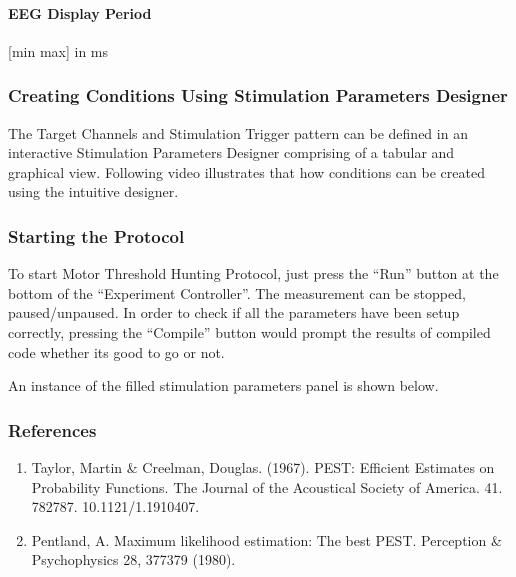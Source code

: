 \documentclass[letterpaper,10pt,english]{sphinxmanual}
\begin{document}
\paragraph{EEG Display Period}
\label{\detokenize{7_MEPThresholdHunting:eeg-display-period}}
\sphinxAtStartPar
{[}min max{]} in ms


\subsubsection{Creating Conditions Using Stimulation Parameters Designer}
\label{\detokenize{7_MEPThresholdHunting:creating-conditions-using-stimulation-parameters-designer}}
\sphinxAtStartPar
The Target Channels and Stimulation Trigger pattern can be defined in an interactive Stimulation Parameters Designer comprising of a tabular and graphical view. Following video illustrates that how conditions can be created using the intuitive designer.


\subsubsection{Starting the Protocol}
\label{\detokenize{7_MEPThresholdHunting:starting-the-protocol}}
\sphinxAtStartPar
To start Motor Threshold Hunting Protocol, just press the “Run” button at the bottom of the “Experiment Controller”. The measurement can be stopped, paused/unpaused. In order to check if all the parameters have been setup correctly, pressing the “Compile” button would prompt the results of compiled code whether its good to go or not.

\sphinxAtStartPar
An instance of the filled stimulation parameters panel is shown below.

\begin{figure}[htbp]
\centering

\noindent{}
\end{figure}


\subsubsection{References}
\label{\detokenize{7_MEPThresholdHunting:references}}\begin{enumerate}
%
\item {} 
\sphinxAtStartPar
Taylor, Martin \& Creelman, Douglas. (1967). PEST: Efficient Estimates on Probability Functions. The Journal of the Acoustical Society of America. 41. 782\sphinxhyphen{}787. 10.1121/1.1910407.

\item {} 
\sphinxAtStartPar
Pentland, A. Maximum likelihood estimation: The best PEST. Perception \& Psychophysics 28, 377\textendash{}379 (1980). 

\end{enumerate}
\end{document}

